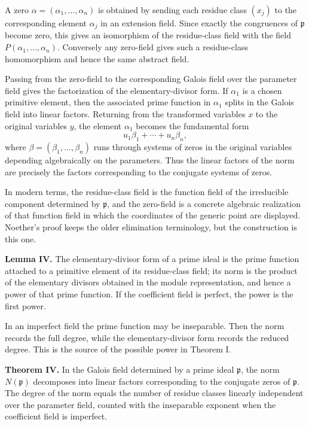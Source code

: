 \documentclass[11pt]{article}
\begin{document}
A zero $\alpha=(\alpha_1,\ldots,\alpha_n)$ is obtained by sending each residue class $(x_j)$ to the corresponding element $\alpha_j$ in an extension field. Since exactly the congruences of $\mathfrak p$ become zero, this gives an isomorphism of the residue-class field with the field $P(\alpha_1,\ldots,\alpha_n)$. Conversely any zero-field gives such a residue-class homomorphism and hence the same abstract field.

Passing from the zero-field to the corresponding Galois field over the parameter field gives the factorization of the elementary-divisor form. If $\alpha_1$ is a chosen primitive element, then the associated prime function in $\alpha_1$ splits in the Galois field into linear factors. Returning from the transformed variables $x$ to the original variables $y$, the element $\alpha_1$ becomes the fundamental form
\[
  u_1\beta_1+\cdots+u_n\beta_n,
\]
where $\beta=(\beta_1,\ldots,\beta_n)$ runs through systems of zeros in the original variables depending algebraically on the parameters. Thus the linear factors of the norm are precisely the factors corresponding to the conjugate systems of zeros.

In modern terms, the residue-class field is the function field of the irreducible component determined by $\mathfrak p$, and the zero-field is a concrete algebraic realization of that function field in which the coordinates of the generic point are displayed. Noether's proof keeps the older elimination terminology, but the construction is this one.

\textbf{Lemma IV.} The elementary-divisor form of a prime ideal is the prime function attached to a primitive element of its residue-class field; its norm is the product of the elementary divisors obtained in the module representation, and hence a power of that prime function. If the coefficient field is perfect, the power is the first power.

In an imperfect field the prime function may be inseparable. Then the norm records the full degree, while the elementary-divisor form records the reduced degree. This is the source of the possible power in Theorem I.

\textbf{Theorem IV.} In the Galois field determined by a prime ideal $\mathfrak p$, the norm $N(\mathfrak p)$ decomposes into linear factors corresponding to the conjugate zeros of $\mathfrak p$. The degree of the norm equals the number of residue classes linearly independent over the parameter field, counted with the inseparable exponent when the coefficient field is imperfect.
\end{document}

